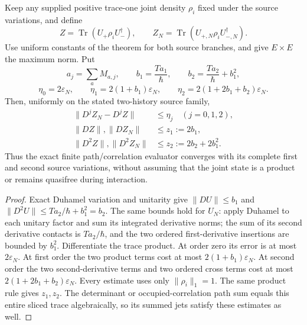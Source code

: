 \documentclass[12pt,a4paper]{article}
\begin{document}
\begin{corollary}
\label{p4:cor:v249-joint-state-influence-jet-error}
Keep any supplied positive trace-one joint density $\rho_i$ fixed under
the source variations, and define
\[
 Z=\operatorname{Tr}(U_+\rho_iU_-^\dagger),\qquad
 Z_N=\operatorname{Tr}(U_{+,N}\rho_iU_{-,N}^\dagger).
\]
Use uniform constants of the theorem for both source branches, and give
$E\times E$ the maximum norm. Put
\[
 a_j=\sum_aM_{a,j},\qquad b_1=\frac{Ta_1}{\hbar},\qquad
 b_2=\frac{Ta_2}{\hbar}+b_1^2,
\]
\[
 \eta_0=2\varepsilon_N,\qquad
 \eta_1=2(1+b_1)\varepsilon_N,\qquad
 \eta_2=2(1+2b_1+b_2)\varepsilon_N.
\]
Then, uniformly on the stated two-history source family,
\[
 \boxed{\begin{aligned}
       \|D^jZ_N-D^jZ\|&\le\eta_j\quad(j=0,1,2),\\
       \|DZ\|,\|DZ_N\|&\le z_1:=2b_1,\\
       \|D^2Z\|,\|D^2Z_N\|&\le z_2:=2b_2+2b_1^2.
       \end{aligned}}
\]
Thus the exact finite path/correlation evaluator converges with its complete
first and second source variations, without assuming that the joint state
is a product or remains quasifree during interaction.
\end{corollary}
\begin{proof}
Exact Duhamel variation and unitarity give
$\|DU\|\le b_1$ and
$\|D^2U\|\le Ta_2/\hbar+b_1^2=b_2$. The same bounds hold for $U_N$:
apply Duhamel to each unitary factor and sum its integrated derivative
norms; the sum of its second derivative contacts is $Ta_2/\hbar$, and
the two ordered first-derivative insertions are bounded by $b_1^2$.
Differentiate the trace product. At order zero its error is at most
$2\varepsilon_N$. At first order the two product terms cost at most
$2(1+b_1)\varepsilon_N$. At second order the two second-derivative
terms and two ordered cross terms cost at most
$2(1+2b_1+b_2)\varepsilon_N$. Every estimate uses only
$\|\rho_i\|_1=1$. The same product rule gives $z_1,z_2$.
The determinant or occupied-correlation path sum equals this entire sliced
trace algebraically, so its summed jets satisfy these estimates as well.
\end{proof}
\end{document}
